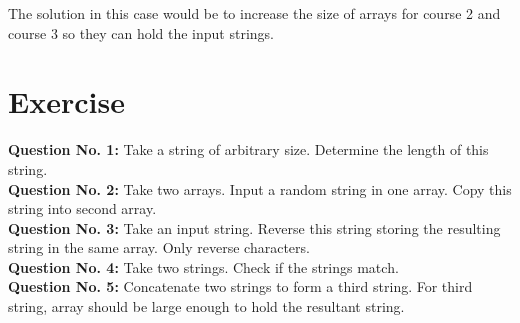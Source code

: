 \documentclass{article}
\begin{document}
The solution in this case would be to increase the size of arrays for course 2 and course 3 so they can hold the input strings.
\section{Exercise}
\textbf{Question No. 1:} Take a string of arbitrary size. Determine the length of this string.\\
\textbf{Question No. 2:} Take two arrays. Input a random string in one array. Copy this string into second array.\\
\textbf{Question No. 3:} Take an input string. Reverse this string storing the resulting string in the same array. Only reverse characters.\\
\textbf{Question No. 4:} Take two strings. Check if the strings match.\\
\textbf{Question No. 5:} Concatenate two strings to form a third string. For third string, array should be large enough to hold the resultant string.\\
\end{document}
